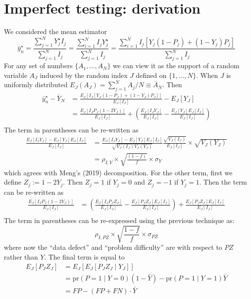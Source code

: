 \documentclass[aoas]{amsart}
\def\pr{\text{pr}}
\begin{document}
\section{Imperfect testing: derivation}

We considered the mean estimator
$$
\bar y_n^\star = \frac{\sum_{j=1}^N Y_j^\star I_j}{\sum_{j=1}^N I_j} = \frac{\sum_{i=1}^N  I_j Y_j^\star }{\sum_{j=1}^N  I_j } = \frac{\sum_{i=1}^N  I_j \left[ Y_j (1-P_j) + (1-Y_j) P_j \right]}{\sum_{j=1}^N  I_j }
$$
For any set of numbers $\{ A_1, \ldots, A_N \}$ we can view it as the support of a random variable $A_J$ induced by the random index $J$ defined on $\{1,\ldots, N\}$.  When $J$ is uniformly distributed $E_J (A_J) = \sum_{j=1}^N A_j / N \equiv \bar A_N$. Then
$$
\begin{aligned}
\bar y_n^\star  - \bar Y_N &= \frac{E_J \left[ I_J \left[ Y_J (1-P_J) + (1-Y_J) P_J \right] \right]}{E_J [ I_J ] } - E_J[Y_J] \\
&= \frac{E_J \left[ I_J P_J (1-2Y_J) \right]}{E_J [ I_J ] } + \left( \frac{E_J [I_J Y_J]}{E_J [ I_J ] } - \frac{E_J[Y_J] E_J[I_J]}{E_J[I_J]} \right) \\
\end{aligned}
$$
The term in parentheses can be re-written as
$$
\begin{aligned}
\frac{E_J [I_J Y_J]- E_J[Y_J] E_J[I_J]}{E_J[I_J]} &=  \frac{E_J [I_J Y_J]- E_J[Y_J] E_J[I_J]}{\sqrt{V_J(I_J) V_J(Y_J)}} \frac{\sqrt{V_J(I_J)}}{E_J[I_J]} \times \sqrt{V_J(Y_J)} \\
&= \rho_{I,Y} \times \sqrt{\frac{(1-f)}{f}} \times \sigma_Y
\end{aligned}
$$
which agrees with Meng's (2019) decomposition. For the other term, first we define $Z_j := 1 - 2 Y_j $. Then $Z_j = 1$ if $Y_j = 0$ and $Z_j = -1$ if $Y_j = 1$. Then the term can be re-written as
$$
\begin{aligned}
\frac{E_J \left[ I_J P_J (1-2Y_J) \right]}{E_J [ I_J ] } &= \left( \frac{E_J \left[ I_J P_J Z_J \right]}{E_J [ I_J ] } -  \frac{E_J \left[ P_J Z_J \right] E_J[ I_J]}{E_J [ I_J ] } \right) +  \frac{E_J \left[ P_J Z_J \right] E_J[ I_J]}{E_J [ I_J ] } \\
\end{aligned}
$$
The term in parentheses can be re-expressed using the previous technique as:
$$
\rho_{I, PZ} \times \sqrt{\frac{1-f}{f}} \times \sigma_{PZ}
$$
where now the ``data defect'' and ``problem difficulty'' are with respect to $PZ$ rather than $Y$. The final term is equal to
$$
\begin{aligned}
E_J [P_J Z_J ] &= E_J [ E_J [ P_J Z_J \mid Y_J ] ] \\
&= \pr (P = 1 \mid Y = 0) (1-\bar Y) - \pr(P=1 \mid Y = 1) \bar Y \\
&= FP - (FP + FN) \cdot \bar Y
\end{aligned}
$$
\end{document}
